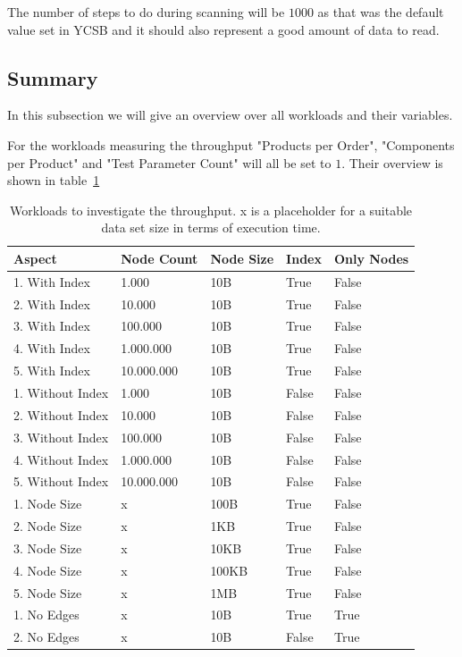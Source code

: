 The number of steps to do during scanning will be $ 1000 $ as that was the default value set in YCSB and it should also represent a good amount of data to read.

\subsection{Summary}
\label{ch:design:se:summary}
In this subsection we will give an overview over all workloads and their variables.

For the workloads measuring the throughput "Products per Order",
"Components per Product" and "Test Parameter Count" will all be set to $ 1 $.
Their overview is shown in table~\ref{tab:throughput}

\begin{table}[!h]
  \begin{minipage}{\textwidth}
    \begin{tabularx}{\textwidth}{ | X | X | X | X | X | }
      \hline
      Aspect & Node Count & Node Size & Index & Only Nodes \\ \hline
      1. With Index & 1.000 & 10B & True & False \\ \hline
      2. With Index & 10.000 & 10B & True & False \\ \hline
      3. With Index & 100.000 & 10B & True & False \\ \hline
      4. With Index & 1.000.000 & 10B & True & False \\ \hline
      5. With Index & 10.000.000 & 10B & True & False \\ \hline
      1. Without Index & 1.000 & 10B & False & False \\ \hline
      2. Without Index & 10.000 & 10B & False & False \\ \hline
      3. Without Index & 100.000 & 10B & False & False \\ \hline
      4. Without Index & 1.000.000 & 10B & False & False \\ \hline
      5. Without Index & 10.000.000 & 10B & False & False \\ \hline
      1. Node Size & x & 100B & True & False \\ \hline
      2. Node Size & x & 1KB & True & False \\ \hline
      3. Node Size & x & 10KB & True & False \\ \hline
      4. Node Size & x & 100KB & True & False \\ \hline
      5. Node Size & x & 1MB & True & False \\ \hline
      1. No Edges & x & 10B & True & True \\ \hline
      2. No Edges & x & 10B & False & True \\ \hline
    \end{tabularx}
  \end{minipage}
  \caption{Workloads to investigate the throughput. x is a placeholder for a suitable data set size in terms of execution time.}
  \label{tab:throughput}
\end{table}

